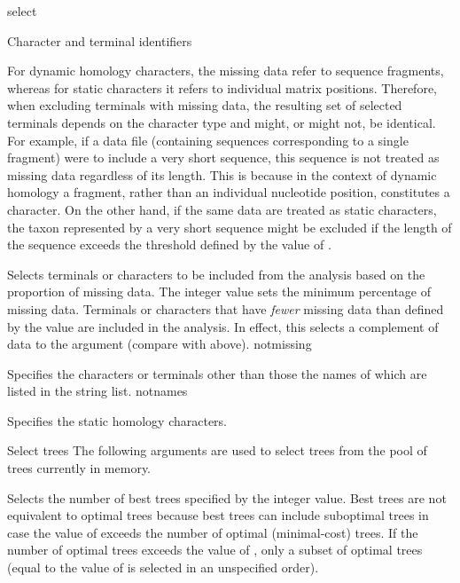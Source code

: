 \begin{command}{select}{}
\begin{arguments}
\begin{argumentgroup}{Character and terminal identifiers}
\begin{statement}
For dynamic homology characters, the missing data refer to
sequence fragments, whereas for static characters it refers to
individual matrix positions. Therefore, when excluding
terminals with missing data, the resulting set of selected
terminals depends on the character type and might, or
might not, be identical. For example, if a data file (containing
sequences corresponding to a single fragment) were to include
a very short sequence, this sequence is not treated as
missing data regardless of its length. This is because in the
context of dynamic homology a fragment, rather than an
individual nucleotide position, constitutes a character.
On the other hand, if the same data are treated as static characters,
the taxon represented by a very short sequence
might be excluded if the length of the sequence exceeds the
threshold defined by the value of .
\end{statement}

{Selects terminals or characters to be included from the analysis
based on the proportion of missing data. The
integer value sets the minimum percentage of missing
data. Terminals or characters that have \emph{fewer} missing data
than defined by the value are included in the analysis.
In effect, this selects a complement of data to the argument 
(compare with  above).}
{notmissing} 

{Specifies the characters or terminals other than those the
names of which are listed in the string list.}
{notnames}


{Specifies the static homology characters.}
{}

\end{argumentgroup}

\begin{argumentgroup}{Select trees}
{The following arguments are used to select trees from the pool of trees currently in memory.}

{Selects the number of best trees specified by the integer value.
Best trees are not equivalent to optimal trees because best trees
can include suboptimal trees in case the value of
 exceeds the number of optimal (minimal-cost)
trees. If the number of optimal trees exceeds the value of
, only a subset of optimal trees (equal to the
value of  is selected in an unspecified order).} 
{}


\end{argumentgroup}
\end{arguments}
\end{command}
